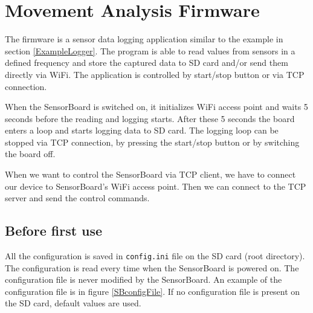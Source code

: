 \section{Movement Analysis Firmware}
\label{HorseFirmware}
The firmware is a sensor data logging application similar to the example in section \ref{ExampleLogger}. The program is able to read values from sensors in a defined frequency and store the captured data to SD card and/or send them directly via WiFi. The application is controlled by start/stop button or via TCP connection.

When the SensorBoard is switched on, it initializes WiFi access point and waits 5 seconds before the reading and logging starts. After these 5 seconds the board enters a loop and starts logging data to SD card. The logging loop can be stopped via TCP connection, by pressing the start/stop button or by switching the board off.

When we want to control the SensorBoard via TCP client, we have to connect our device to SensorBoard's WiFi access point. Then we can connect to the TCP server and send the control commands.

\subsection{Before first use}
\label{beforeFirstUse}
All the configuration is saved in \texttt{config.ini} file on the SD card (root directory). The configuration is read every time when the SensorBoard is powered on. The configuration file is never modified by the SensorBoard. An example of the configuration file is in figure \ref{SBconfigFile}. If no configuration file is present on the SD card, default values are used.

